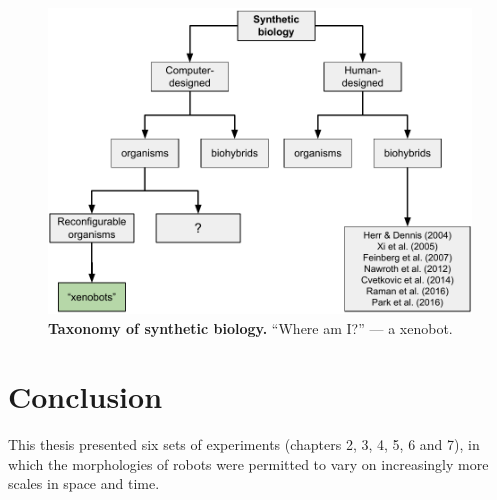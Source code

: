 \begin{figure}
    \centering
    \includegraphics[width=\linewidth]{fig/synthbio.pdf}
    \vspace{1pt}
    \caption{%
    \textbf{Taxonomy of synthetic biology.}
    ``Where am I?'' --- a xenobot.
    \label{fig:synthbio}%
    }
\end{figure}




\section{Conclusion}

This thesis presented six sets of experiments (chapters 2, 3, 4, 5, 6 and 7), in which the morphologies of robots were permitted to vary on increasingly more scales in space and time.

